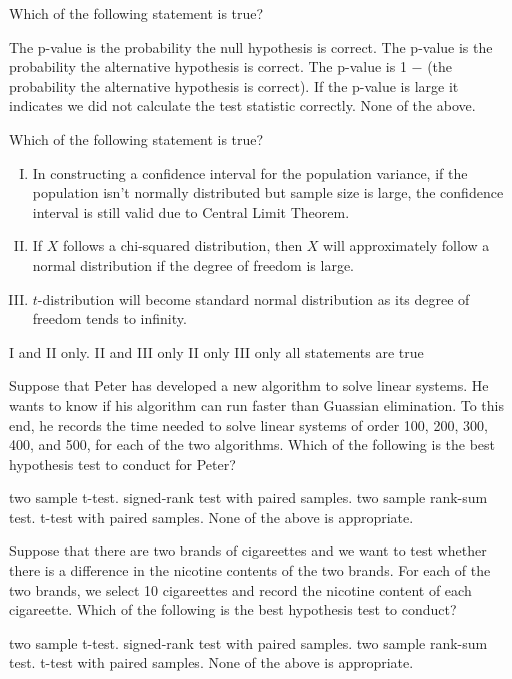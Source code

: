 \documentclass[letterpaper,10pt,addpoints]{exam}
\begin{document}
\begin{questions}
\question Which of the following statement is true?
\begin{choices}
  \choice The p-value is the probability the null hypothesis is correct.
  \choice The p-value is the probability the alternative hypothesis is correct.
  \choice The p-value is 1 $-$ (the probability the alternative hypothesis is correct).
  \choice If the p-value is large it indicates we did not calculate the test statistic correctly.
  \correctchoice None of the above.
\end{choices}

\question Which of the following statement is true?
\begin{enumerate}[I.]
  \item In constructing a confidence interval for the population variance, if the population isn't normally distributed but sample size is large, the confidence interval is still valid due to Central Limit Theorem.
  \item If $X$ follows a chi-squared distribution, then $X$ will approximately follow a normal distribution if the degree of freedom is large.
  \item $t$-distribution will become standard normal distribution as its degree of freedom tends to infinity. 
\end{enumerate}
\begin{choices}
  \choice I and II only.
  \correctchoice II and III only
  \choice II only
  \choice III only
  \choice all statements are true
  \end{choices}


\question Suppose that Peter has developed a new algorithm to solve linear systems. He wants to know if his algorithm can run faster than Guassian elimination. To this end, he records the time needed to solve linear systems of order 100, 200, 300, 400, and 500, for each of the two algorithms. Which of the following is the best hypothesis test to conduct for Peter?
\begin{choices}
  \choice two sample t-test.
  \correctchoice signed-rank test with paired samples.
  \choice two sample rank-sum test.
  \choice t-test with paired samples.
  \choice None of the above is appropriate.
\end{choices}


\question Suppose that there are two brands of cigareettes and we want to test whether there is a difference in the nicotine contents of the two brands. For each of the two brands, we select 10 cigareettes and record the nicotine content of each cigareette. Which of the following is the best hypothesis test to conduct?
\begin{choices}
  \choice two sample t-test.
  \choice signed-rank test with paired samples.
  \correctchoice two sample rank-sum test.
  \choice t-test with paired samples.
  \choice None of the above is appropriate.
\end{choices}


\end{questions}
\end{document}

